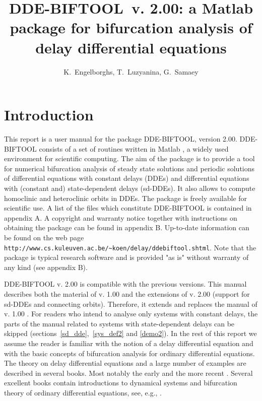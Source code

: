 \documentclass[10pt]{article}
\gdef \DDEBIFCODE{{\scshape DDE-BIFTOOL}}
\begin{document}
\leftmargin    0mm
\rightmargin -20mm

\title{{\DDEBIFCODE\ v. 2.00}: a Matlab package for bifurcation 
analysis of delay differential equations}

\author{K.~Engelborghs, T.~Luzyanina, G.~Samaey}

%
%

\section{Introduction}

This report is a user manual for the package
{\DDEBIFCODE}, version 2.00. {\DDEBIFCODE} 
consists of a set of routines written in Matlab 
\cite{Mat00}, a widely used environment for scientific computing. 
The aim of the package is to provide a tool for
numerical bifurcation analysis of steady state solutions and 
periodic solutions of differential equations
with constant delays (DDEs) and differential equations with
(constant and) state-dependent delays (sd-DDEs).  
It also allows to compute homoclinic and heteroclinic orbits in DDEs.
The package is freely available for scientific use.
A list of the files which constitute {\DDEBIFCODE}
is contained in appendix A.
A copyright and warranty notice together with instructions on 
obtaining the package can be found in appendix B.
Up-to-date information can be found on the web page
\verb#http://www.cs.kuleuven.ac.be/~koen/delay/ddebiftool.shtml#.
Note that the package is typical research software and
is provided "as is" without warranty of any kind
(see appendix B).

DDE-BIFTOOL v. 2.00 is compatible with the previous
versions. This manual describes both the material of v. 1.00 
and the extensions of v. 2.00 (support for sd-DDEs and connecting orbits).
Therefore, it extends and replaces the manual of v. 1.00 \cite{tw305}.
For readers who intend to analyse only systems with 
constant delays, the parts of the manual related to systems
with state-dependent delays can be 
skipped (sections~\ref{sd_dde},~\ref{sys_def2} and \ref{demo2}).
In the rest of this report we assume the reader is familiar with
the notion of a delay differential equation and with the basic
concepts of bifurcation analysis for ordinary differential equations.
The theory on
delay differential equations
and a large number of examples are described in several
books. Most notably the early \cite{Bell63,El's73,Driv77,Hale77a,Kolm86}
and the more recent \cite{Azbe91,Kolm92,Hale93,Diek95,Kolm99}.
Several excellent books contain introductions to dynamical
systems and bifurcation theory of ordinary differential
equations, see, e.g., \cite{Chow82,Guck83,Argy94,Seyd94,Kuzn95}.
\end{document}
